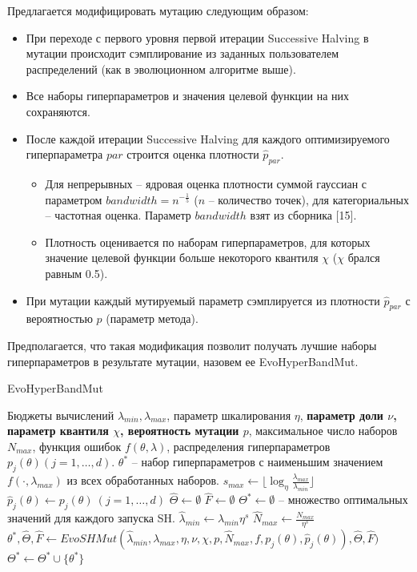 \documentclass[a4paper,12pt]{article}
\begin{document}
Предлагается модифицировать мутацию следующим образом:
\begin{itemize}
    \item При переходе с первого уровня первой итерации Successive Halving в мутации происходит сэмплирование из заданных пользователем распределений (как в эволюционном алгоритме выше).
    \item Все наборы гиперпараметров и значения целевой функции на них сохраняются.
    \item После каждой итерации Successive Halving для каждого оптимизируемого гиперпараметра $par$ строится оценка плотности $\hat{p}_{par}$.
    \begin{itemize}
        \item Для непрерывных -- ядровая оценка плотности суммой гауссиан с параметром $bandwidth = n^{-\frac{1}{5}}$ ($n$ -- количество точек), для категориальных -- частотная оценка. Параметр $bandwidth$ взят из сборника [15].
        \item Плотность оценивается по наборам гиперпараметров, для которых значение целевой функции больше некоторого квантиля $\chi$ ($\chi$ брался равным 0.5).
    \end{itemize}
    \item При мутации каждый мутируемый параметр сэмплируется из плотности $\hat{p}_{par}$ с вероятностью $p$ (параметр метода).
\end{itemize}

Предполагается, что такая модификация позволит получать лучшие наборы гиперпараметров в результате мутации, назовем ее EvoHyperBandMut.

\begin{algorithm}[H]
    \caption{EvoHyperBandMut}\label{alg:ehbmut}
  \begin{algorithmic}[1]
    \INPUT Бюджеты вычислений $\lambda_{min}, \lambda_{max}$, параметр шкалирования $\eta$, \textbf{параметр доли $\nu$, параметр квантиля $\chi$, вероятность мутации $p$}, максимальное число наборов $N_{max}$, функция ошибок $f(\theta, \lambda)$, распределения гиперпараметров $p_{j}(\theta) (j = 1,\dots,d)$.
    \OUTPUT $\theta^*$ -- набор гиперпараметров с наименьшим значением $f(\cdot, \lambda_{max})$ из всех обработанных наборов.
    \STATE $s_{max} \gets \lfloor \log_{\eta} \frac{\lambda_{max}}{\lambda_{min}} \rfloor$
    \STATE $\hat{p}_j(\theta) \gets p_j(\theta) \ (j = 1,\dots,d)$
    \STATE $\hat{\Theta} \gets \emptyset$
    \STATE $\hat{F} \gets \emptyset$
    \STATE $\Theta^* \gets \emptyset$ -- множество оптимальных значений для каждого запуска SH.
        \STATE $\hat{\lambda}_{min} \gets \lambda_{min}\eta^{s}$
        \STATE $\hat{N}_{max} \gets \frac{N_{max}}{\eta^{s}}$
        \STATE $\theta^*, \hat{\Theta}, \hat{F} \gets EvoSHMut(\hat{\lambda}_{min}, \lambda_{max}, \eta, \nu, \chi, p, \hat{N}_{max}, f, p_{j}(\theta), \hat{p}_{j}(\theta)), \hat{\Theta}, \hat{F})$
        \STATE $\Theta^* \gets \Theta^* \cup \{\theta^*\}$
    \ENDFOR
  \end{algorithmic}

\end{algorithm}
\end{document}
